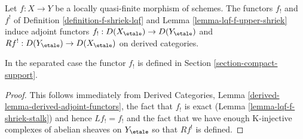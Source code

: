 \begin{lemma}
\label{lemma-lqf-shriek-derived}
Let $f : X \to Y$ be a locally quasi-finite morphism of schemes. The functors
$f_!$ and $f^!$ of Definition \ref{definition-f-shriek-lqf} and
Lemma \ref{lemma-lqf-f-upper-shriek}
induce adjoint functors $f_! : D(X_\etale) \to D(Y_\etale)$
and $Rf^! : D(Y_\etale) \to D(X_\etale)$ on derived categories.
\end{lemma}

\noindent
In the separated case the functor $f_!$ is defined in
Section \ref{section-compact-support}.

\begin{proof}
This follows immediately from
Derived Categories, Lemma \ref{derived-lemma-derived-adjoint-functors},
the fact that $f_!$ is exact (Lemma \ref{lemma-lqf-f-shriek-stalk})
and hence $Lf_! = f_!$
and the fact that we have enough K-injective complexes of abelian sheaves
on $Y_\etale$ so that $Rf^!$ is defined.
\end{proof}



























